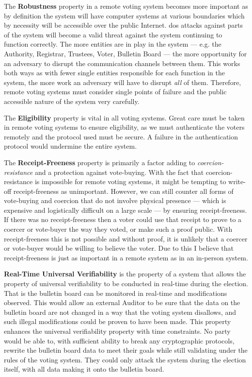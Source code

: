 The \textbf{Robustness} property in a remote voting system becomes more important as by definition the system will have computer systems at various boundaries which by necessity will be accessible over the public Internet. \Gls{dos} attacks against parts of the system will become a valid threat against the system continuing to function correctly. The more entities are in play in the system --- e.g. the Authority, Registrar, Trustees, Voter, Bulletin Board --- the more opportunity for an adversary to disrupt the communication channels between them. This works both ways as with fewer single entities responsible for each function in the system, the more work an adversary will have to disrupt \emph{all} of them. Therefore, remote voting systems must consider single points of failure and the public accessible nature of the system very carefully.

The \textbf{Eligibility} property is vital in all voting systems. Great care must be taken in remote voting systems to ensure eligibility, as we must authenticate the voters remotely and the protocol used must be secure. A failure in the authentication protocol would undermine the entire system. 

The \textbf{Receipt-Freeness} property is primarily a factor adding to \emph{coercion-resistance} and a protection against vote-buying. With the fact that coercion-resistance is impossible for remote voting systems, it might be tempting to write-off receipt-freeness as unimportant. However, we can still counter all forms of vote-buying and coercion that do not involve physical presence --- which is expensive and logistically difficult on a large scale --- by ensuring receipt-freeness. If there was no receipt-freeness then a voter could use that receipt to prove to a coercer or vote-buyer the way they voted, or make such a proof public. With receipt-freeness this is not possible and without proof, it is unlikely that a coercer or vote-buyer would be willing to believe the voter. Due to this I believe that receipt-freeness is just as important in a remote system as in an in-person system.

\textbf{Real-Time Universal Verifiability} is the property of a system that allows the property of universal verifiability to be conducted in real-time during the election. That is the bulletin board can be monitored in real-time and modifications observed. This would allow an external Auditor to be sure that the data on the bulletin board are not changed in a way that the voting system disallows, and such illegal modifications could be proven to have been made. This property enhances the universal verifiability property with time constraints. No party would be able to, with sufficient ability to break any cryptographic protocols, rewrite the bulletin board data to meet their goals while still validating under the rules of the voting system. They could only attack the system during the election itself, with all data making it onto the bulletin board.


